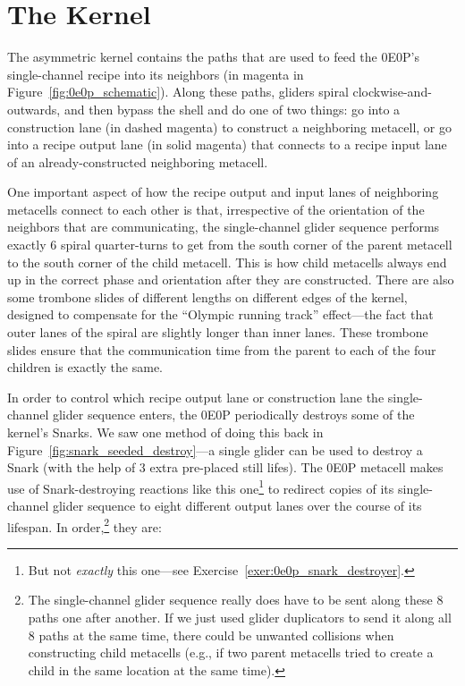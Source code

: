 \section{The Kernel}\label{sec:0e0p_structure_kernel}

The asymmetric kernel contains the paths that are used to feed the 0E0P's single-channel recipe into its neighbors (in magenta in Figure~\ref{fig:0e0p_schematic}). Along these paths, gliders spiral clockwise-and-outwards, and then bypass the shell and do one of two things: go into a construction lane (in dashed magenta) to construct a neighboring metacell, or go into a recipe output lane (in solid magenta) that connects to a recipe input lane of an already-constructed neighboring metacell.

One important aspect of how the recipe output and input lanes of neighboring metacells connect to each other is that, irrespective of the orientation of the neighbors that are communicating, the single-channel glider sequence performs exactly 6 spiral quarter-turns to get from the south corner of the parent metacell to the south corner of the child metacell. This is how child metacells always end up in the correct phase and orientation after they are constructed. There are also some trombone slides of different lengths on different edges of the kernel, designed to compensate for the ``Olympic running track'' effect---the fact that outer lanes of the spiral are slightly longer than inner lanes. These trombone slides ensure that the communication time from the parent to each of the four children is exactly the same.

In order to control which recipe output lane or construction lane the single-channel glider sequence enters, the 0E0P periodically destroys some of the kernel's Snarks. We saw one method of doing this back in Figure~\ref{fig:snark_seeded_destroy}---a single glider can be used to destroy a Snark (with the help of 3 extra pre-placed still lifes). The 0E0P metacell makes use of Snark-destroying reactions like this one\footnote{But not \emph{exactly} this one---see Exercise~\ref{exer:0e0p_snark_destroyer}.} to redirect copies of its single-channel glider sequence to eight different output lanes over the course of its lifespan. In order,\footnote{The single-channel glider sequence really does have to be sent along these $8$ paths one after another. If we just used glider duplicators to send it along all $8$ paths at the same time, there could be unwanted collisions when constructing child metacells (e.g., if two parent metacells tried to create a child in the same location at the same time).} they are:\smallskip

